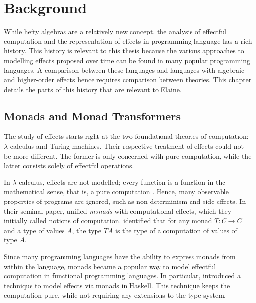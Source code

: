 \chapter{Background}\label{chap:background}

While hefty algebras are a relatively new concept, the analysis of effectful computation and the representation of effects in programming language has a rich history. This history is relevant to this thesis because the various approaches to modelling effects proposed over time can be found in many popular programming languages. A comparison between these languages and languages with algebraic and higher-order effects hence requires comparison between theories. This chapter details the parts of this history that are relevant to Elaine.

\section{Monads and Monad Transformers}

The study of effects starts right at the two foundational theories of computation: $\lambda$-calculus and Turing machines. Their respective treatment of effects could not be more different. The former is only concerned with pure computation, while the latter consists solely of effectful operations.

In $\lambda$-calculus, effects are not modelled; every function is a function in the mathematical sense, that is, a pure computation \autocite{moggi_computational_1989}. Hence, many observable properties of programs are ignored, such as non-determinism and side effects. In their seminal paper, \textcite{moggi_computational_1989} unified \emph{monads} with computational effects, which they initially called notions of computation. \citeauthor{moggi_computational_1989} identified that for any monad $T: C \to C$ and a type of values $A$, the type $T A$ is the type of a computation of values of type $A$.

Since many programming languages have the ability to express monads from within the language, monads became a popular way to model effectful computation in functional programming languages. In particular, \textcite{peyton_jones_imperative_1993} introduced a technique to model effects via monads in Haskell. This technique keeps the computation pure, while not requiring any extensions to the type system.


